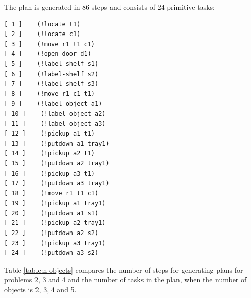 \documentclass[paper=a4, fontsize=11pt]{scrartcl}
\begin{document}
	\vspace{5mm}
	
	The plan is generated in 86 steps and consists of 24 primitive tasks: \\
	
\begin{lstlisting}
[ 1 ]    (!locate t1)
[ 2 ]    (!locate c1)
[ 3 ]    (!move r1 t1 c1)
[ 4 ]    (!open-door d1)
[ 5 ]    (!label-shelf s1)
[ 6 ]    (!label-shelf s2)
[ 7 ]    (!label-shelf s3)
[ 8 ]    (!move r1 c1 t1)
[ 9 ]    (!label-object a1)
[ 10 ]    (!label-object a2)
[ 11 ]    (!label-object a3)
[ 12 ]    (!pickup a1 t1)
[ 13 ]    (!putdown a1 tray1)
[ 14 ]    (!pickup a2 t1)
[ 15 ]    (!putdown a2 tray1)
[ 16 ]    (!pickup a3 t1)
[ 17 ]    (!putdown a3 tray1)
[ 18 ]    (!move r1 t1 c1)
[ 19 ]    (!pickup a1 tray1)
[ 20 ]    (!putdown a1 s1)
[ 21 ]    (!pickup a2 tray1)
[ 22 ]    (!putdown a2 s2)
[ 23 ]    (!pickup a3 tray1)
[ 24 ]    (!putdown a3 s2)
\end{lstlisting}

\vspace{5mm}

	Table \ref{table:n-objects} compares the number of steps for generating plans for problems 2, 3 and 4 and the number of tasks in the plan, when the number of objects is 2, 3, 4 and 5.
	
\end{document}
